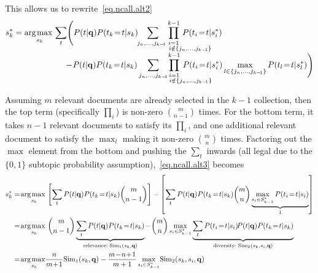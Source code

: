 This allows us to rewrite~\eqref{eq.ncall.alt2}
\begin{align}
 & s_k^* = \, \argmax_{s_k} \sum_t \Biggl( P(t|\vec{q}) P(t_k\!=\!t|s_k)  \sum_{\hspace{-1mm} j_n, \dots, j_{k-\!1}} \hspace{-13.5mm} \prod_{\substack{i=1 \\ \hspace{14mm} i \notin \{j_n, \dots, j_{k-\!1}\}}}^{k-1} \hspace{-13mm} P(t_i\!=\!t|s_i^*) \nonumber \\[-1.5mm]
 & \hspace{25mm} - \!P(t|\vec{q}) P(t_k\!=\!t|s_k) \sum_{j_n, \dots, j_{k-\!1}} \hspace{-14mm} \prod_{\substack{i=1 \\ \hspace{14mm} i \notin \{j_n, \dots, j_{k-\!1}\}}}^{k-1} \hspace{-13mm} P(t_i\!=\!t|s_i^*) \max_{l \in \{j_n, \dots, j_{k-\!1}\}} P(t_l\!=\!t|s_l^*) \Biggr) \label{eq.ncall.alt3}
\end{align}

Assuming $m$ relevant documents are already selected in the $k-1$ collection, then the top term (specifically $\prod_i$) is non-zero $\binom{m}{n-1}$ times.  For the
bottom term, it takes $n-1$ relevant documents to satisfy its
$\prod_i$, and one additional relevant document to satisfy the
$\max_l$ making it non-zero $\binom{m}{n}$ times.  Factoring out the
$\max$ element from the bottom and pushing the $\sum_t$ inwards (all legal
due to the $\{0,1\}$ subtopic probability assumption),~\eqref{eq.ncall.alt3} becomes
\begin{align}
 s_k^* & = \argmax_{s_k} \left[ \sum_t P(t|\vec{q}) P(t_k\!=\!t|s_k) \binom{m}{n-1} \right]
 - \left[ \sum_t P(t|\vec{q}) P(t_k\!=\!t|s_k) \binom{m}{n} \underbrace{\max_{s_i \in S_{k-1}^*} P(t_i\!=\!t|s_i)}_{1} \right] \nonumber\\
 & = \argmax_{s_k} \binom{m}{n-1} \underbrace{\sum_t P(t|\vec{q}) P(t_k\!=\!t|s_k)}_{\textrm{relevance}: \; \Sim_1(s_k,\vec{q})}
 - \binom{m}{n} \max_{s_i \in S_{k-1}^*} \underbrace{\sum_t P(t_i\!=\!t|s_i) \!P(t|\vec{q}) P(t_k\!=\!t|s_k)}_{\textrm{diversity}: \; \Sim_2(s_k,s_i,\vec{q})} \label{note9}\\
 & = \argmax_{s_k} \!\! \frac{n}{m\!+\!1} \Sim_1(s_k,\vec{q}) - \frac{m\!-\!n\!+\!1}{m+1} \max_{s_i \in S_{k-1}^*} \! \Sim_2(s_k,s_i,\vec{q}) \label{note10}
\end{align}  

